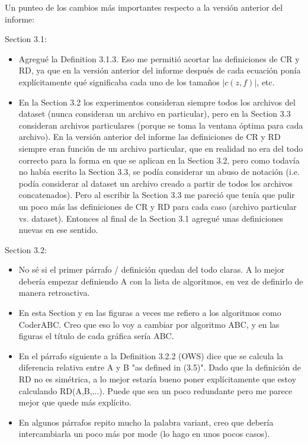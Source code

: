 
\clearpage
Un punteo de los cambios más importantes respecto a la versión anterior del informe:

Section 3.1:
\begin{itemize}
\vspace{-10pt}
\item Agregué la Definition 3.1.3. Eso me permitió acortar las definiciones de CR y RD, ya que en la versión anterior del informe después de cada ecuación ponía explícitamente qué significaba cada uno de los tamaños $|c(z,f)|$, etc.

\item En la Section 3.2 los experimentos consideran siempre todos los archivos del dataset (nunca consideran un archivo en particular), pero en la Section 3.3 consideran archivos particulares (porque se toma la ventana óptima para cada archivo). En la versión anterior del informe las definiciones de CR y RD siempre eran función de un archivo particular, que en realidad no era del todo correcto para la forma en que se aplican en la Section 3.2, pero como todavía no había escrito la Section 3.3, se podía considerar un abuso de notación (i.e. podía considerar al dataset un archivo creado a partir de todos los archivos concatenados). Pero al escribir la Section 3.3 me pareció que tenía que pulir un poco más las definiciones de CR y RD para cada caso (archivo particular vs. dataset). Entonces al final de la Section 3.1 agregué unas definiciones nuevas en ese sentido. 
\end{itemize}

Section 3.2:
\begin{itemize}
\vspace{-10pt}
\item No sé si el primer párrafo / definición quedan del todo claras. A lo mejor debería empezar definiendo A con la lista de algoritmos, en vez de definirlo de manera retroactiva.

\item En esta Section y en las figuras a veces me refiero a los algoritmos como CoderABC. Creo que eso lo voy a cambiar por algoritmo ABC, y en las figuras el título de cada gráfica sería ABC.

\item En el párrafo siguiente a la Definition 3.2.2 (OWS) dice que se calcula la diferencia relativa entre A y B "as defined in (3.5)". Dado que la definición de RD no es simétrica, a lo mejor estaría bueno poner explícitamente que estoy calculando RD(A,B,...). Puede que sea un poco redundante pero me parece mejor que quede más explícito.

\item En algunos párrafos repito mucho la palabra variant, creo que debería intercambiarla un poco más por mode (lo hago en unos pocos casos).
\end{itemize}


